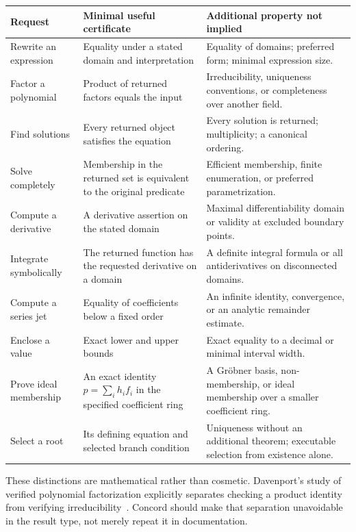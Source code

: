 \documentclass[11pt,a4paper]{article}
\theoremstyle{remark}
\begin{document}
\begin{longtable}{@{}L{.20\textwidth}L{.36\textwidth}L{.36\textwidth}@{}}
\toprule
Request & Minimal useful certificate & Additional property not implied \\
\midrule
\endhead
Rewrite an expression & Equality under a stated domain and interpretation &
Equality of domains; preferred form; minimal expression size.\\
Factor a polynomial & Product of returned factors equals the input &
Irreducibility, uniqueness conventions, or completeness over another field.\\
Find solutions & Every returned object satisfies the equation &
Every solution is returned; multiplicity; a canonical ordering.\\
Solve completely & Membership in the returned set is equivalent to the original
predicate & Efficient membership, finite enumeration, or preferred parametrization.\\
Compute a derivative & A derivative assertion on the stated domain &
Maximal differentiability domain or validity at excluded boundary points.\\
Integrate symbolically & The returned function has the requested derivative on a
domain & A definite integral formula or all antiderivatives on disconnected domains.\\
Compute a series jet & Equality of coefficients below a fixed order &
An infinite identity, convergence, or an analytic remainder estimate.\\
Enclose a value & Exact lower and upper bounds & Exact equality to a decimal or
minimal interval width.\\
Prove ideal membership & An exact identity $p=\sum_i h_i f_i$ in the specified
coefficient ring & A Gr\"obner basis, non-membership, or ideal membership over a
smaller coefficient ring.\\
Select a root & Its defining equation and selected branch condition &
Uniqueness without an additional theorem; executable selection from existence alone.\\
\bottomrule
\end{longtable}

These distinctions are mathematical rather than cosmetic. Davenport's study of
verified polynomial factorization explicitly separates checking a product identity
from verifying irreducibility~\cite{davenport}. Concord should make that
separation unavoidable in the result type, not merely repeat it in documentation.
\end{document}

